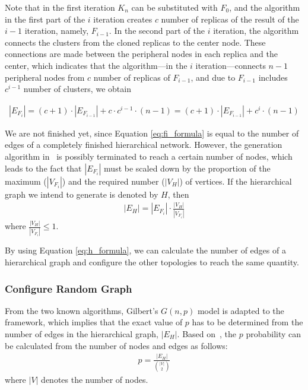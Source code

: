 Note that in the first iteration $K_n$ can be substituted with $F_0$, and the algorithm in the first part of the $i$ iteration creates $c$ number of replicas of the result of the $i-1$ iteration, namely, $F_{i-1}$. In the second part of the $i$ iteration, the algorithm connects the clusters from the cloned replicas to the center node. These connections are made between the peripheral nodes in each replica and the center, which indicates that the algorithm---in the $i$ iteration---connects $n-1$ peripheral nodes from $c$ number of replicas of $F_{i-1}$, and due to $F_{i-1}$ includes $c^{i-1}$ number of clusters, we obtain

\begin{align}\label{eq:fi_formula}
	|E_{F_i}| = (c+1) \cdot |E_{F_{i-1}}| + c \cdot c^{i-1} \cdot (n - 1)	= (c+1) \cdot |E_{F_{i-1}}| + c^i \cdot (n - 1)
\end{align}

We are not finished yet, since Equation \ref{eq:fi_formula} is equal to the number of edges of a completely finished hierarchical network. However, the generation algorithm in \framework~is possibly terminated to reach a certain number of nodes, which leads to the fact that $|E_{F_i}|$ must be scaled down by the proportion of the maximum ($|V_{F_i}|$) and the required number ($|V_H|$) of vertices. If the hierarchical graph we intend to generate is denoted by $H$, then
\begin{align}\label{eq:h_formula}
	|E_H| = |E_{F_i}| \cdot \frac{|V_H|}{|V_{F_i}|}
\end{align}
where $\frac{|V_H|}{|V_{F_i}|} \leq 1$.

By using Equation \ref{eq:h_formula}, we can calculate the number of edges of a hierarchical graph and configure the other topologies to reach the same quantity.

\subsubsection{Configure Random Graph}
From the two known algorithms, Gilbert's $G(n,p)$ model is adapted to the framework, which implies that the exact value of $p$ has to be determined from the number of edges in the hierarchical graph, $|E_H|$. Based on~\cite{random_p}, the $p$ probability can be calculated from the number of nodes and edges as follows:
\begin{align}
	p = \frac{|E_H|}{\binom{|V|}{2}}
\end{align}
where $|V|$ denotes the number of nodes.

